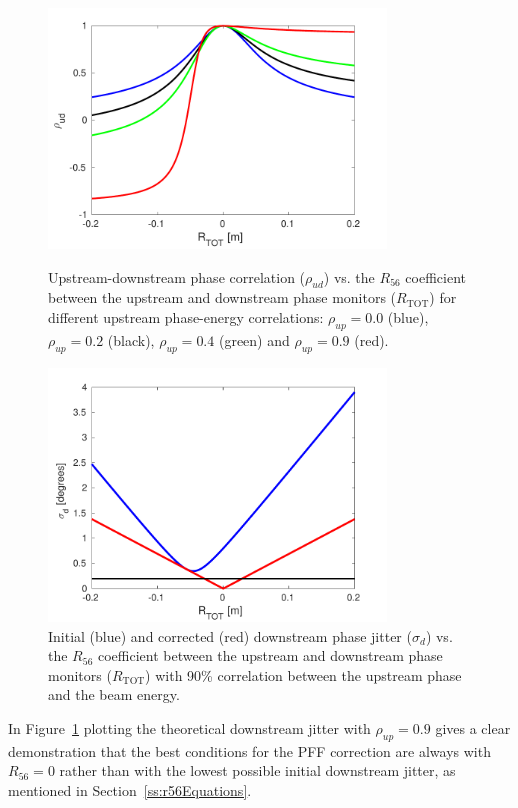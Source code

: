 \begin{figure}
  \centering
  \includegraphics[width=0.8\textwidth]{Figures/propagation/corrVsR56_CTENCorr}
  \caption{Upstream-downstream phase correlation (\(\rho_{ud}\)) vs. the \(R_{56}\) coefficient between the upstream and downstream phase monitors (\(R_{\mathrm{TOT}}\)) for different upstream phase-energy correlations: \(\rho_{up}=0.0\) (blue), \(\rho_{up}=0.2\) (black), \(\rho_{up}=0.4\) (green) and \(\rho_{up}=0.9\) (red).}
  \label{f:corrVsR56_CTENCorr}
  \includegraphics[width=0.8\textwidth]{Figures/propagation/jitVsR56_90ctencorr}
  \caption{Initial (blue) and corrected (red) downstream phase jitter (\(\sigma_d\)) vs. the \(R_{56}\) coefficient between the upstream and downstream phase monitors (\(R_{\mathrm{TOT}}\)) with 90\% correlation between the upstream phase and the beam energy.}
  \label{f:jitVsR56_90ctencorr}
\end{figure}


In Figure~\ref{f:jitVsR56_90ctencorr} plotting the theoretical downstream jitter with \(\rho_{up} = 0.9\) gives a clear demonstration that the best conditions for the PFF correction are always with \(R_{56} = 0\) rather than with the lowest possible initial downstream jitter, as mentioned in Section~\ref{ss:r56Equations}. %


